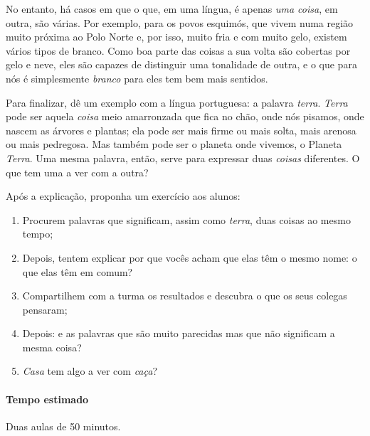 \documentclass[11pt]{extarticle}
\begin{document}

No entanto, há casos em que o que, em uma língua, é apenas \textit{uma coisa},
em outra, são várias. Por exemplo, para os povos esquimós, que vivem
numa região muito próxima ao Polo Norte e, por isso, muito fria e com
muito gelo, existem vários tipos de branco. Como boa parte das coisas
a sua volta são cobertas por gelo e neve, eles são capazes de distinguir 
uma tonalidade de outra, e o que para nós é simplesmente \textit{branco}
para eles tem bem mais sentidos. 

Para finalizar, dê um exemplo com a língua portuguesa: a palavra \textit{terra}.
\textit{Terra} pode ser aquela \textit{coisa} meio amarronzada que fica no 
chão, onde nós pisamos, onde nascem as árvores e plantas; ela pode 
ser mais firme ou mais solta, mais arenosa ou mais pedregosa.
Mas também pode ser o planeta onde vivemos, o Planeta \textit{Terra}. 
Uma mesma palavra, então, serve para expressar duas \textit{coisas} diferentes. 
O que tem uma a ver com a outra? 


Após a explicação, proponha um exercício aos alunos:

\begin{enumerate}
\item Procurem palavras que significam, assim como \textit{terra}, 
duas coisas ao mesmo tempo;

\item Depois, tentem explicar por que vocês acham que elas têm o mesmo nome:
o que elas têm em comum?

\item Compartilhem com a turma os resultados e descubra o que os seus
colegas pensaram;

\item Depois: e as palavras que são muito parecidas mas 
que não significam a mesma coisa? 

\item \textit{Casa} tem algo a ver com \textit{caça}?
\end{enumerate}

\paragraph{Tempo estimado} Duas aulas de 50 minutos.
\end{document}
